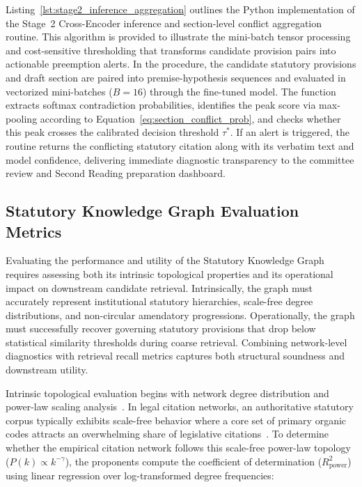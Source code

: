     Listing~\ref{lst:stage2_inference_aggregation} outlines the Python implementation of the Stage~2 Cross-Encoder inference and section-level conflict aggregation routine. This algorithm is provided to illustrate the mini-batch tensor processing and cost-sensitive thresholding that transforms candidate provision pairs into actionable preemption alerts. In the procedure, the candidate statutory provisions and draft section are paired into premise-hypothesis sequences and evaluated in vectorized mini-batches ($B = 16$) through the fine-tuned model. The function extracts softmax contradiction probabilities, identifies the peak score via max-pooling according to Equation~\ref{eq:section_conflict_prob}, and checks whether this peak crosses the calibrated decision threshold $\tau^*$. If an alert is triggered, the routine returns the conflicting statutory citation along with its verbatim text and model confidence, delivering immediate diagnostic transparency to the committee review and Second Reading preparation dashboard.

    \subsection{Statutory Knowledge Graph Evaluation Metrics}
    \label{sec:kg_evaluation_metrics}
    Evaluating the performance and utility of the Statutory Knowledge Graph requires assessing both its intrinsic topological properties and its operational impact on downstream candidate retrieval. Intrinsically, the graph must accurately represent institutional statutory hierarchies, scale-free degree distributions, and non-circular amendatory progressions. Operationally, the graph must successfully recover governing statutory provisions that drop below statistical similarity thresholds during coarse retrieval. Combining network-level diagnostics with retrieval recall metrics captures both structural soundness and downstream utility.

    Intrinsic topological evaluation begins with network degree distribution and power-law scaling analysis~\cite{barabasi1999emergence}. In legal citation networks, an authoritative statutory corpus typically exhibits scale-free behavior where a core set of primary organic codes attracts an overwhelming share of legislative citations~\cite{katz_2023_legal_nlp}. To determine whether the empirical citation network follows this scale-free power-law topology ($P(k) \propto k^{-\gamma}$), the proponents compute the coefficient of determination ($R_{\text{power}}^2$) using linear regression over log-transformed degree frequencies:

